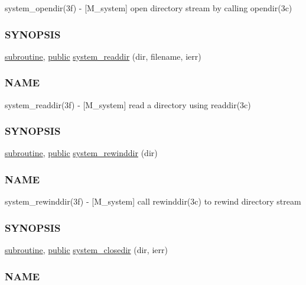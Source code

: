 \begin{DoxyCompactItemize}
\begin{DoxyCompactList}
system\+\_\+opendir(3f) -\/ \mbox{[}M\+\_\+system\mbox{]} open directory stream by calling opendir(3c) \subsubsection*{S\+Y\+N\+O\+P\+S\+IS}\end{DoxyCompactList}\item 
\hyperlink{M__stopwatch_83_8txt_acfbcff50169d691ff02d4a123ed70482}{subroutine}, \hyperlink{M__stopwatch_83_8txt_a2f74811300c361e53b430611a7d1769f}{public} \hyperlink{namespacem__system_a983df5b2d7cb5842d69c4a31829403e0}{system\+\_\+readdir} (dir, filename, ierr)
\begin{DoxyCompactList}\small\item\em \subsubsection*{N\+A\+ME}

system\+\_\+readdir(3f) -\/ \mbox{[}M\+\_\+system\mbox{]} read a directory using readdir(3c) \subsubsection*{S\+Y\+N\+O\+P\+S\+IS}\end{DoxyCompactList}\item 
\hyperlink{M__stopwatch_83_8txt_acfbcff50169d691ff02d4a123ed70482}{subroutine}, \hyperlink{M__stopwatch_83_8txt_a2f74811300c361e53b430611a7d1769f}{public} \hyperlink{namespacem__system_a3ffe757195ade8052e8acabd196ee3ca}{system\+\_\+rewinddir} (dir)
\begin{DoxyCompactList}\small\item\em \subsubsection*{N\+A\+ME}

system\+\_\+rewinddir(3f) -\/ \mbox{[}M\+\_\+system\mbox{]} call rewinddir(3c) to rewind directory stream \subsubsection*{S\+Y\+N\+O\+P\+S\+IS}\end{DoxyCompactList}\item 
\hyperlink{M__stopwatch_83_8txt_acfbcff50169d691ff02d4a123ed70482}{subroutine}, \hyperlink{M__stopwatch_83_8txt_a2f74811300c361e53b430611a7d1769f}{public} \hyperlink{namespacem__system_acd442b52c64fc50482bc08b0ac8a50d1}{system\+\_\+closedir} (dir, ierr)
\begin{DoxyCompactList}\small\item\em \subsubsection*{N\+A\+ME}


\end{DoxyCompactList}
\end{DoxyCompactItemize}

